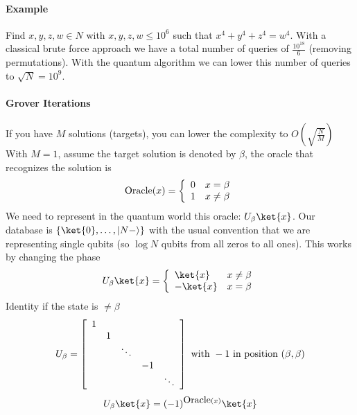 \documentclass[10pt]{report}
\begin{document}
\paragraph{Example} Find $x,y,z,w\in N$ with $x,y,z,w\leq 10^6$ such that $x^4+y^4+z^4=w^4$. With a classical brute force approach we have a total number of queries of $\frac{10^{18}}{6}$ (removing permutations). With the quantum algorithm we can lower this number of queries to $\sqrt{N} = 10^9$.
\paragraph{Grover Iterations} If you have $M$ solutions (targets), you can lower the complexity to $O\left(\sqrt{\frac{N}{M}}\right)$\\
With $M=1$, assume the target solution is denoted by $\beta$, the oracle that recognizes the solution is $$\hbox{Oracle}(x) = \left\{\begin{array}{c l}
0&x=\beta\\1&x\neq\beta
\end{array}\right.$$
We need to represent in the quantum world this oracle: $U_\beta\ket{x}$. Our database is $\{\ket{0},\ldots,|N-\rangle\}$ with the usual convention that we are representing single qubits (so $\log N$ qubits from all zeros to all ones). This works by changing the phase
$$U_\beta\ket{x}=\left\{\begin{array}{l l}
\ket{x}&x\neq\beta\\-\ket{x}&x=\beta
\end{array}\right.$$
Identity if the state is $\neq\beta$
$$U_\beta = \left[\begin{array}{c c c c c}
1\\
&1\\
& &\ddots\\
& & &-1\\
& & & &\ddots\\
\end{array}\right]\hbox{ with }-1\hbox{ in position }(\beta,\beta)$$
$$U_\beta\ket{x}=(-1)^{\hbox{Oracle}(x)}\ket{x}$$
\end{document}
